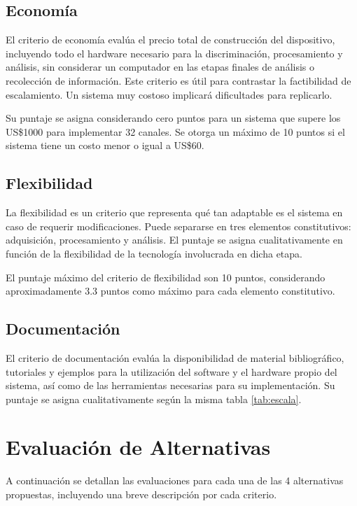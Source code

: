 \subsection*{Economía}
\par El criterio de economía evalúa el precio total de construcción del dispositivo, incluyendo todo el hardware necesario para la discriminación, procesamiento y análisis, sin considerar un computador en las etapas finales de análisis o recolección de información. Este criterio es útil para contrastar la factibilidad de escalamiento. Un sistema muy costoso implicará dificultades para replicarlo.
\par Su puntaje se asigna considerando cero puntos para un sistema que supere los US\$1000 para implementar 32 canales. Se otorga un máximo de 10 puntos si el sistema tiene un costo menor o igual a US\$60.

\subsection*{Flexibilidad}
\par La flexibilidad es un criterio que representa qué tan adaptable es el sistema en caso de requerir modificaciones. Puede separarse en tres elementos constitutivos: adquisición, procesamiento y análisis. El puntaje se asigna cualitativamente en función de la flexibilidad de la tecnología involucrada en dicha etapa.
\par El puntaje máximo del criterio de flexibilidad son 10 puntos, considerando aproximadamente 3.3 puntos como máximo para cada elemento constitutivo.

\subsection*{Documentación}
\par El criterio de documentación evalúa la disponibilidad de material bibliográfico, tutoriales y ejemplos para la utilización del software y el hardware propio del sistema, así como de las herramientas necesarias para su implementación. Su puntaje se asigna cualitativamente según la misma tabla \ref{tab:escala}.

\newpage
\section{Evaluación de Alternativas}
\label{evaluacion}
\par A continuación se detallan las evaluaciones para cada una de las 4 alternativas propuestas, incluyendo una breve descripción por cada criterio.
